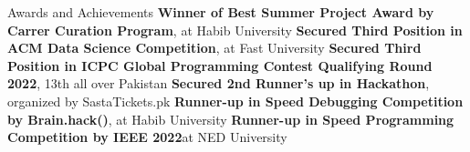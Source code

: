 \begin{rubric}{Awards and Achievements}
    \entry*[2023] \textbf{Winner of Best Summer Project Award by Carrer Curation Program}, at Habib University
    \entry*[2023]\textbf{Secured Third Position in ACM Data Science Competition}, at Fast University
    \entry*[2023]\textbf{Secured Third Position in ICPC Global Programming Contest Qualifying Round 2022}, 13th all over Pakistan
    \entry*[2023]\textbf{Secured 2nd Runner's up in Hackathon}, organized by SastaTickets.pk
    \entry*[2022]\textbf{Runner-up in Speed Debugging Competition by Brain.hack()}, at Habib University
    \entry*[2022]\textbf{Runner-up in Speed Programming Competition by IEEE 2022}at NED University 

    \end{rubric}
    